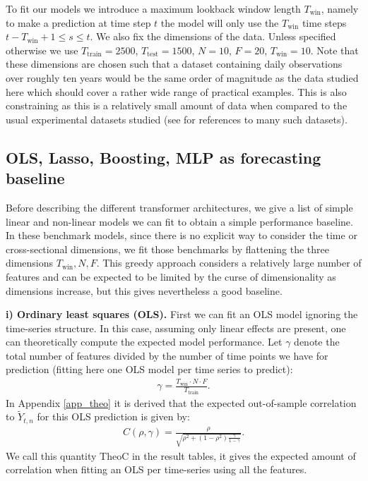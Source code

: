 \documentclass{article}
\begin{document}
To fit our models we introduce a maximum lookback window length $T_{\text{win}}$, namely to make a prediction at time step $t$ the model will only use the $T_{\text{win}}$ time steps $t-T_{\text{win}} +1 \leq s \leq t$. We also fix the dimensions of the data. Unless specified otherwise we use $T_{\text{train}}=2500$, $T_{\text{test}}=1500$, $N=10$, $F=20$, $T_{\text{win}} =10$. Note that these dimensions are chosen such that a dataset containing daily observations over roughly ten years would be the same order of magnitude as the data studied here which should cover a rather wide range of practical examples. This is also constraining as this is a relatively small amount of data when compared to the usual experimental datasets studied (see \cite{wu2021autoformer, zhou2021informer} for references to many such datasets).

\subsection{OLS, Lasso, Boosting, MLP as forecasting baseline}\label{sec_baselines}

Before describing the different transformer architectures, we give a list of simple linear and non-linear models we can fit to obtain a simple performance baseline. In these benchmark models, since there is no explicit way to consider the time or cross-sectional dimensions, we fit those benchmarks by flattening the three dimensions $T_{\text{win}}, N, F$. This greedy approach considers a relatively large number of features and can be expected to be limited by the curse of dimensionality as dimensions increase, but this gives nevertheless a good baseline.

\textbf{i) Ordinary least squares (OLS).}
First we can fit an OLS model ignoring the time-series structure.
In this case, assuming only linear effects are present, one can theoretically compute the expected model performance. Let $\gamma$ denote the total number of features divided by the number of time points we have for prediction (fitting here one OLS model per time series to predict):
\begin{align}
\gamma = \frac{T_{\text{win}} \cdot N \cdot F}{T_{\text{train}}}.
\end{align}
In Appendix \ref{app_theo} it is derived that the expected out-of-sample correlation to $\widetilde Y_{t,n}$ for this OLS prediction is given by:
\begin{align}\label{eq_theo}
C(\rho, \gamma) = \frac{\rho}{\sqrt{\rho^2 + (1- \rho^2) \frac{\gamma}{1-\gamma}}}.
\end{align}
We call this quantity TheoC in the result tables, it gives the expected amount of correlation when fitting an OLS per time-series using all the features.
\end{document}
